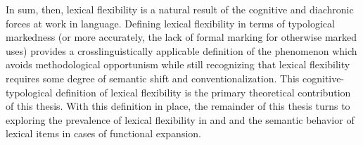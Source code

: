 In sum, then, lexical flexibility is a natural result of the cognitive and diachronic forces at work in language. Defining lexical flexibility in terms of typological markedness (or more accurately, the lack of formal marking for otherwise marked uses) provides a crosslinguistically applicable definition of the phenomenon which avoids methodological opportunism while still recognizing that lexical flexibility requires some degree of semantic shift and conventionalization. This cognitive-typological definition of lexical flexibility is the primary theoretical contribution of this thesis. With this definition in place, the remainder of this thesis turns to exploring the prevalence of lexical flexibility in  and  and the semantic behavior of lexical items in cases of functional expansion.
